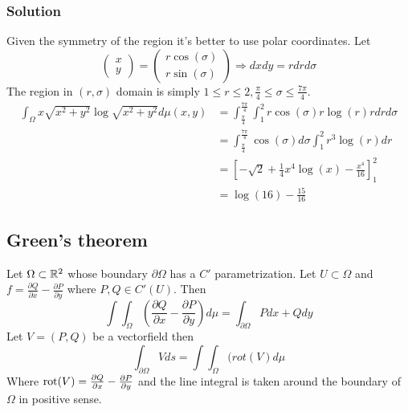 \documentclass[a4paper]{article}
\begin{document}
\subsubsection*{Solution}
Given the symmetry of the region it's better to use polar coordinates. Let $$\begin{pmatrix}
x \\ 
y
\end{pmatrix}= \begin{pmatrix}
r \cos(\sigma) \\ 
r \sin(\sigma)
\end{pmatrix}  \Rightarrow dxdy=rdrd\sigma$$
The region in $(r,\sigma)$ domain is simply $1\leq r\leq 2, \frac{\pi}{4}\leq \sigma \leq \frac{7\pi}{4}$.
\begin{align*}
 \int_\Omega x\sqrt{x^2+y^2} \log \sqrt{x^2+y^2} d\mu(x,y)&= \int_{\frac{\pi}{4}}^{\frac{7\pi}{4}} \int_1^2 r \cos (\sigma) r \log(r) r dr d\sigma \\
& = \int_{\frac{\pi}{4}}^{\frac{7\pi}{4}} \cos(\sigma)d\sigma \int_1^2 r^3 \log(r) dr \\
&= \left[-\sqrt{2}+\frac{1}{4}x^4\log(x) -\frac{x^4}{16} \right]_1^2\\
&= \log(16)-\frac{15}{16}
\end{align*}

\subsection{Green's theorem}
Let $\Omega \subset \mathbb{R}^2$ whose boundary $\partial \Omega$ has a $C'$ parametrization. Let $U\subset \Omega$ and $f=\frac{\partial Q}{\partial x}-\frac{\partial P}{\partial y}$ where $P,Q \in C'(U)$. Then
$$\int \int_\Omega \left(\frac{\partial Q}{\partial x}-\frac{\partial P}{\partial y}\right) d\mu = \int_{\partial \Omega} Pdx+Qdy$$
Let $V=(P,Q)$ be a vectorfield then $$\int_{\partial \Omega} V ds= \int \int_\Omega (rot(V) d\mu$$
Where $\operatorname{rot}(V)=\frac{\partial Q}{\partial x}-\frac{\partial P}{\partial y}$ and the line integral is taken around the boundary of $\Omega$ in positive sense.
\end{document}
